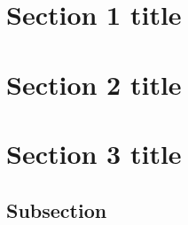 \section{Section 1 title}

\section{Section 2 title}

\section{Section 3 title}

\subsection{Subsection}

\cite{latexcompanion}